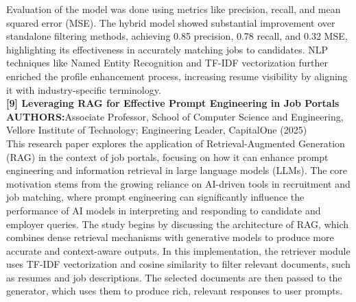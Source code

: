 \documentclass[a4paper, 12pt]{report}
\begin{document}
Evaluation of the model was done using metrics like precision, recall, and mean squared error (MSE). The hybrid model showed substantial improvement over standalone filtering methods, achieving 0.85 precision, 0.78 recall, and 0.32 MSE, highlighting its effectiveness in accurately matching jobs to candidates. NLP techniques like Named Entity Recognition and TF-IDF vectorization further enriched the profile enhancement process, increasing resume visibility by aligning it with industry-specific terminology.\\
\noindent\textbf{[9] Leveraging RAG for Effective Prompt Engineering in Job Portals}\\
\textbf{AUTHORS:}Associate Professor, School of Computer Science and Engineering, Vellore Institute of Technology; Engineering Leader, CapitalOne (2025)\\
This research paper explores the application of Retrieval-Augmented Generation (RAG) in the context of job portals, focusing on how it can enhance prompt engineering and information retrieval in large language models (LLMs). The core motivation stems from the growing reliance on AI-driven tools in recruitment and job matching, where prompt engineering can significantly influence the performance of AI models in interpreting and responding to candidate and employer queries. The study begins by discussing the architecture of RAG, which combines dense retrieval mechanisms with generative models to produce more accurate and context-aware outputs. In this implementation, the retriever module uses TF-IDF vectorization and cosine similarity to filter relevant documents, such as resumes and job descriptions. The selected documents are then passed to the generator, which uses them to produce rich, relevant responses to user prompts.
\end{document}
